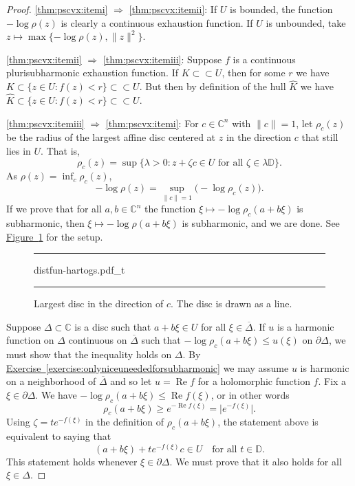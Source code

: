 \documentclass[12pt,openany]{book}
\renewcommand{\Re}{\operatorname{Re}}
\newcommand{\snorm}[1]{\lVert {#1} \rVert}
\newcommand{\babs}[1]{\bigl\lvert {#1} \bigr\rvert}
\newcommand{\C}{{\mathbb{C}}}
\newcommand{\D}{{\mathbb{D}}}
\theoremstyle{plain}
\theoremstyle{remark}
\theoremstyle{definition}
\newenvironment{myfig}{%
\begin{figure}[h!t]
\noindent\rule{\textwidth}{0.5pt}\vspace{12pt}\par\centering}%
{\par\noindent\rule{\textwidth}{0.5pt}
\end{figure}}
\theoremstyle{exercise}
\theoremstyle{example}
\newcommand{\figureref}[1]{\hyperref[#1]{Figure~\ref*{#1}}}
\newcommand{\exerciseref}[1]{\hyperref[#1]{Exercise~\ref*{#1}}}
\begin{document}
\begin{proof}
\ref{thm:pscvx:itemi}
$\Rightarrow$
\ref{thm:pscvx:itemii}:
If $U$ is bounded,
the function $-\log \rho(z)$ is clearly a continuous exhaustion function.
If $U$ is unbounded, take
$z \mapsto \max \{ -\log \rho(z) , \snorm{z}^2 \}$.

\ref{thm:pscvx:itemii}
$\Rightarrow$
\ref{thm:pscvx:itemiii}:
Suppose $f$ is a continuous plurisubharmonic exhaustion function.
If $K \subset \subset U$, then for some $r$ we have
$K \subset \{ z \in U : f(z) < r \} \subset \subset U$.
But then by definition of the hull $\widehat{K}$ we have
$\widehat{K} \subset \{ z \in U : f(z) < r \} \subset \subset U$.

\ref{thm:pscvx:itemiii}
$\Rightarrow$
\ref{thm:pscvx:itemi}:
For $c \in \C^n$ with $\snorm{c}=1$, let
$\rho_c(z)$ be the radius of the largest affine disc centered at $z$
in the direction $c$ that still lies in $U$.  That is,
\begin{equation*}
\rho_c(z) =
\sup \bigl\{ \lambda > 0 :
z+ \zeta c \in U \text{ for all $\zeta \in \lambda\D$} \bigr\} .
\end{equation*}
As $\rho(z) = \inf_c \rho_c(z)$,
\begin{equation*}
- \log \rho(z) = \sup_{\snorm{c}=1} \bigl(-\log \rho_c(z)\bigr) .
\end{equation*}
If we prove that for all $a, b \in \C^n$ the function $\xi \mapsto -\log \rho_c(a+b\xi)$ is
subharmonic, then $\xi \mapsto - \log \rho(a+b\xi)$ is subharmonic,
and we are done.
See \figureref{fig:distfun-hartogs} for the setup.
\begin{myfig}
{distfun-hartogs.pdf_t}
\caption{Largest disc in the direction of $c$.
The disc is drawn as a line.\label{fig:distfun-hartogs}}
\end{myfig}

Suppose $\Delta \subset \C$ is a disc such that
$a+b\xi \in U$
for all $\xi \in
\overline{\Delta}$.
If $u$ is a harmonic function on $\Delta$ continuous on $\overline{\Delta}$
such that
$- \log \rho_c(a+b\xi) \leq u(\xi)$ on $\partial \Delta$, we must
show that the inequality holds on $\Delta$.
By \exerciseref{exercise:onlyniceuneededforsubharmonic}
we may assume $u$ is harmonic on a neighborhood of $\overline{\Delta}$
and so let $u = \Re f$ for a holomorphic function $f$.
Fix a $\xi \in \partial \Delta$.  We have  $- \log \rho_c(a+b\xi) \leq \Re
f(\xi)$,
or in other words
\begin{equation*}
\rho_c(a+b\xi) \geq e^{-\Re f(\xi)} = \babs{e^{-f(\xi)}}.
\end{equation*}
Using $\zeta = t e^{-f(\xi)}$ in the definition of $\rho_c(a+b\xi)$, the statement above is equivalent
to saying that
\begin{equation*}
(a+b\xi)+te^{-f(\xi)}c \in U \quad \text{for all $t \in \D$}.
\end{equation*}
This statement holds whenever $\xi \in \partial \Delta$.  We must prove that
it also holds for all $\xi \in \Delta$.


\end{proof}
\end{document}
